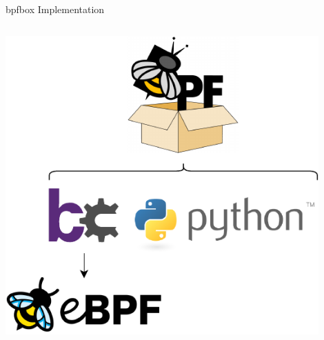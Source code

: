 \documentclass[12pt, dvipsnames, aspectratio=169]{beamer}
\begin{document}
\begin{frame}[c]{bpfbox Implementation}
\begin{columns}
\begin{column}{0.33\textwidth}
\begin{center}
            \includegraphics[width=0.9\textwidth]{figs/at-a-glance.pdf}
        \end{center}
        \vspace{2em}
    \end{column}
\end{columns}
\end{frame}


\end{document}
